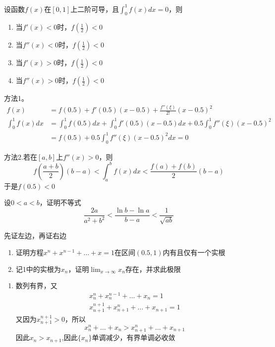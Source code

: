 \documentclass{article}
\begin{document}
\begin{examplle}[]
设函数\(f(x)\)在\([0,1]\)上二阶可导，且\(\displaystyle\int_0^1f(x)dx=0\)，则
\begin{enumerate}
\item 当\(f'(x)<0\)时，\(f(\frac{1}{2})<0\)
\item 当\(f''(x)<0\)时，\(f(\frac{1}{2})<0\)
\item 当\(f'(x)>0\)时，\(f(\frac{1}{2})<0\)
\item 当\(f''(x)>0\)时，\(f(\frac{1}{2})<0\)
\end{enumerate}


方法1。
\begin{align*}
f(x)&=f(0.5)+f'(0.5)(x-0.5)+\frac{f''(\xi)}{2!}(x-0.5)^2\\
\int_0^1f(x)dx&=\int_0^1f(0.5)dx+\int_0^1f'(0.5)(x-0.5)dx+
0.5\int_0^1f''(\xi)(x-0.5)^2\\
&=f(0.5)+0.5\int_0^1f''(\xi)(x-0.5)^2dx=0
\end{align*}

方法2.若在\([a,b]\)上\(f''(x)>0\)，则
\begin{equation*}
f(\frac{a+b}{2})(b-a)<\int_a^bf(x)dx<\frac{f(a)+f(b)}{2}(b-a)
\end{equation*}
于是\(f(0.5)<0\)
\end{examplle}

\begin{examplle}[]
设\(0<a<b\)，证明不等式
\begin{equation*}
\frac{2a}{a^2+b^2}<\frac{\ln b-\ln a}{b-a}<\frac{1}{\sqrt{ab}}
\end{equation*}

先证左边，再证右边
\end{examplle}

\begin{examplle}[]
\begin{enumerate}
\item 证明方程\(x^n+x^{n-1}+\dots+x=1\)在区间\((0.5,1)\)内有且仅有一个实根
\item 记1中的实根为\(x_n\)，证明\(\lim_{x\to\infty}x_n\)存在，并求此极限
\end{enumerate}


\begin{enumerate}
\item 数列有界，又
\begin{align*}
x_n^n+x_n^{n-1}+\dots+x_n=1\\
x_{n+1}^{n+1}+x_{n+1}^n+\dots+x_{n+1}=1
\end{align*}
又因为\(x_{n+1}^{n+1}>0\)，所以
\begin{equation*}
x_n^n+\dots+x_n>x_{n+1}^{n}+\dots+x_{n+1}
\end{equation*}
因此\(x_n>x_{n+1}\),因此\(\{x_n\}\)单调减少，有界单调必收敛
\end{enumerate}
\end{examplle}
\end{document}
